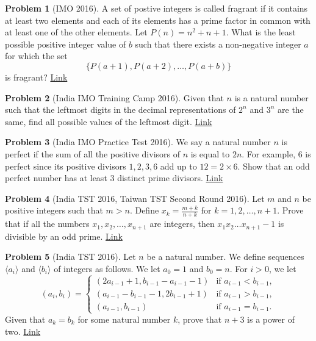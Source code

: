 \documentclass[]{article}
\theoremstyle{definition}
\newtheorem{problem}{Problem}
\begin{document}
\begin{problem}[IMO 2016]
	A set of postive integers is called fragrant if it contains at least two elements and each of its elements has a prime factor in common with at least one of the other elements. Let $P(n)=n^2+n+1$. What is the least possible positive integer value of $b$ such that there exists a non-negative integer $a$ for which the set $$\{P(a+1),P(a+2),\ldots,P(a+b)\}$$is fragrant? \hfill \href{http://artofproblemsolving.com/community/c6h1270992p6642559}{Link}
\end{problem}




\begin{problem}[India IMO Training Camp 2016]
	Given that $n$ is a natural number such that the leftmost digits in the decimal representations of $2^n$ and $3^n$ are the same, find all possible values of the leftmost digit. \hfill \href{http://artofproblemsolving.com/community/c6h1276412p6696449}{Link}
\end{problem}




\begin{problem}[India IMO Practice Test 2016]
	We say a natural number $n$ is perfect if the sum of all the positive divisors of $n$ is equal to $2n$. For example, $6$ is perfect since its positive divisors $1,2,3,6$ add up to $12=2\times 6$. Show that an odd perfect number has at least $3$ distinct prime divisors. \hfill \href{http://artofproblemsolving.com/community/c6h1276406p6696419}{Link}
\end{problem}





\begin{problem}[India TST 2016, Taiwan TST Second Round 2016]
	Let $m$ and $n$ be positive integers such that $m>n$. Define $x_k=\frac{m+k}{n+k}$ for $k=1,2,\ldots,n+1$. Prove that if all the numbers $x_1,x_2,\ldots,x_{n+1}$ are integers, then $x_1x_2\ldots x_{n+1}-1$ is divisible by an odd prime. \flushright \href{http://artofproblemsolving.com/community/c6h1268874p6622379}{Link}
\end{problem}




\begin{problem}[India TST 2016]
	Let $n$ be a natural number. We define sequences $\langle a_i\rangle$ and $\langle b_i\rangle$ of integers as follows. We let $a_0=1$ and $b_0=n$. For $i>0$, we let $$\left( a_i,b_i\right)=\begin{cases} \left(2a_{i-1}+1,b_{i-1}-a_{i-1}-1\right) & \text{if } a_{i-1}<b_{i-1},\\ \left( a_{i-1}-b_{i-1}-1,2b_{i-1}+1\right) & \text{if } a_{i-1}>b_{i-1},\\ \left(a_{i-1},b_{i-1}\right) & \text{if } a_{i-1}=b_{i-1}.\end{cases}$$ Given that $a_k=b_k$ for some natural number $k$, prove that $n+3$ is a power of two. \hfill \href{http://artofproblemsolving.com/community/c6h1276387p6696361}{Link}
\end{problem}
\end{document}

